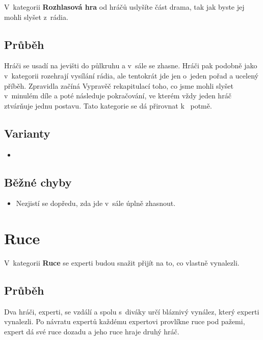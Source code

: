  
V~kategorii \textbf{Rozhlasová hra} od hráčů uslyšíte část drama, tak jak byste jej mohli slyšet z~rádia. 
 
\subsection{Průběh} Hráči se usadí na jevišti do půlkruhu a v~sále se zhasne. Hráči pak podobně jako v~kategorii  rozehrají vysílání rádia, ale tentokrát jde jen o~jeden pořad a ucelený příběh. Zpravidla začíná Vypravěč rekapitulací toho, co jsme mohli slyšet v~minulém díle a poté následuje pokračování, ve kterém vždy jeden hráč ztvárňuje jednu postavu. Tato kategorie se dá přirovnat k~ potmě. 
 
\subsection{ Varianty } \begin{itemize}
\item {}
\end{itemize}
 
\subsection{ Běžné chyby } \begin{itemize}
\item Nezjistí se dopředu, zda jde v~sále úplně zhasnout.
\end{itemize}
 
 
 
 
\needspace{5cm} \section{Ruce} \label{ruce}  
 
 
V~kategorii \textbf{Ruce}  se experti budou snažit přijít na to, co vlastně vynalezli. 
 
\subsection{Průběh} Dva hráči, experti, se vzdálí a  spolu s~diváky určí bláznivý vynález, který experti vynalezli. 
Po návratu expertů každému expertovi provlíkne ruce pod pažemi, expert dá své ruce dozadu a jeho ruce hraje druhý hráč. 
 

